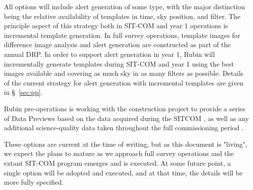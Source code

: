 All options will include alert generation of some type, with the major distinction being the relative availability of templates in time, sky position, and filter.
The principle aspect of this strategy both  in SIT-COM and year 1 operations is incremental template generation.
In full survey operations, template images for difference image analysis and alert generation are constructed as part of the annual DRP.
In order to support alert generation in year 1, Rubin will incrementally generate templates during SIT-COM and year 1 using the best images available and covering as much sky  in as many filters as possible.
Details of the current strategy for alert generation  with incremental templates are given in  \S~\ref{sec:pp}.

Rubin pre-operations is working with the construction project to provide a series of Data Previews based on the data acquired during the SITCOM \svs, as well as any additional science-quality data taken throughout the full commissioning period \citep{RDO-011}.

These options are current at the time of writing, but as this document is "living",  we expect the plans to mature as we approach full survey operations and the extant SIT-COM program emerges and is executed.
At some future point, a single option will be adopted and executed, and at that time, the details will be more fully specified.
